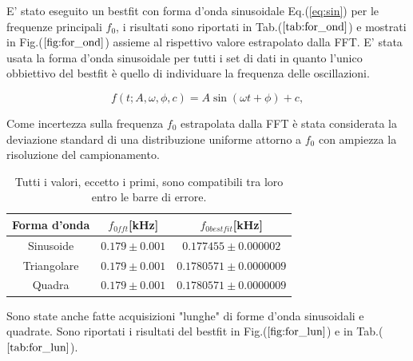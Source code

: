\documentclass{article}
\begin{document}
    E' stato eseguito un bestfit con forma d'onda sinusoidale Eq.(\ref{eq:sin}) 
    per le frequenze principali $f_0$, i risultati 
    sono riportati in Tab.($\ref{tab:for_ond}$) e 
    mostrati in Fig.($\ref{fig:for_ond}$) assieme al rispettivo valore 
    estrapolato dalla FFT.
    E' stata usata la forma d'onda sinusoidale  per tutti i set di dati
    in quanto l'unico obbiettivo del bestfit
    è quello di individuare la frequenza delle oscillazioni.


        \begin{equation}
            f(t; A, \omega, \phi, c) = A \sin{(\omega t + \phi)} + c,
            \label{eq:sin}
        \end{equation}

    Come incertezza sulla frequenza $f_0$ estrapolata dalla FFT è stata 
    considerata la deviazione standard di una distribuzione uniforme attorno
    a $f_0$ con ampiezza la risoluzione del campionamento.  
         

        \begin{table}[H]
            \centering
                \begin{tabular}{ccc}
                    Forma d'onda    &   $f_{0fft}$[kHz]                     & $f_{0bestfit}$[kHz] \\
                    \hline
                    Sinusoide       &   $0.179 \pm 0.001$           & $0.177455 \pm 0.000002$ \\
                    Triangolare     &   $0.179 \pm 0.001$           & $0.1780571\pm 0.0000009$ \\
                    Quadra          &   $0.179 \pm 0.001$           & $0.1780571 \pm 0.0000009$ \\
                \end{tabular}
                \caption{Tutti i valori, eccetto i primi, sono compatibili tra loro 
                        entro le barre di errore. }
                \label{tab:for_ond}
        \end{table}

    Sono state anche fatte acquisizioni "lunghe" di forme d'onda sinusoidali
    e quadrate. Sono riportati i risultati del bestfit in Fig.($\ref{fig:for_lun}$)
    e in Tab.($\ref{tab:for_lun}$).

         
\end{document}
